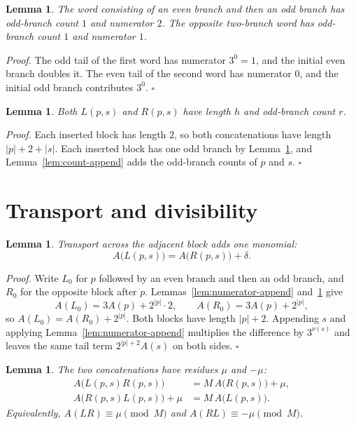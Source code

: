 \documentclass[11pt,letterpaper]{article}
\newtheorem{lemma}[theorem]{Lemma}
\newenvironment{proof}{\noindent\textit{Proof.}}{\hfill\(\square\)}
\begin{document}
\begin{lemma}
\label{lem:blocks}
The word consisting of an even branch and then an odd branch has odd-branch count \(1\) and numerator \(2\). The opposite two-branch word has odd-branch count \(1\) and numerator \(1\).
\end{lemma}

\begin{proof}
The odd tail of the first word has numerator \(3^{0}=1\), and the initial even branch doubles it. The even tail of the second word has numerator \(0\), and the initial odd branch contributes \(3^{0}\).
\end{proof}

\begin{lemma}
\label{lem:shape}
Both \(L(p,s)\) and \(R(p,s)\) have length \(h\) and odd-branch count \(r\).
\end{lemma}

\begin{proof}
Each inserted block has length \(2\), so both concatenations have length \(|p|+2+|s|\). Each inserted block has one odd branch by Lemma~\ref{lem:blocks}, and Lemma~\ref{lem:count-append} adds the odd-branch counts of \(p\) and \(s\).
\end{proof}

\section{Transport and divisibility}

\begin{lemma}
\label{lem:gap}
Transport across the adjacent block adds one monomial:
\[
A\bigl(L(p,s)\bigr)=A\bigl(R(p,s)\bigr)+\delta.
\]
\end{lemma}

\begin{proof}
Write \(L_0\) for \(p\) followed by an even branch and then an odd branch, and \(R_0\) for the opposite block after \(p\). Lemmas~\ref{lem:numerator-append} and~\ref{lem:blocks} give
\[
A(L_0)=3A(p)+2^{|p|}\cdot 2,\qquad A(R_0)=3A(p)+2^{|p|},
\]
so \(A(L_0)=A(R_0)+2^{|p|}\). Both blocks have length \(|p|+2\). Appending \(s\) and applying Lemma~\ref{lem:numerator-append} multiplies the difference by \(3^{\nu(s)}\) and leaves the same tail term \(2^{|p|+2}A(s)\) on both sides.
\end{proof}

\begin{lemma}
\label{lem:residues}
The two concatenations have residues \(\mu\) and \(-\mu\):
\begin{align*}
A\bigl(L(p,s)R(p,s)\bigr)
&=M\,A\bigl(R(p,s)\bigr)+\mu,\\
A\bigl(R(p,s)L(p,s)\bigr)+\mu
&=M\,A\bigl(L(p,s)\bigr).
\end{align*}
Equivalently, \(A(LR)\equiv\mu\pmod M\) and \(A(RL)\equiv-\mu\pmod M\).
\end{lemma}
\end{document}
